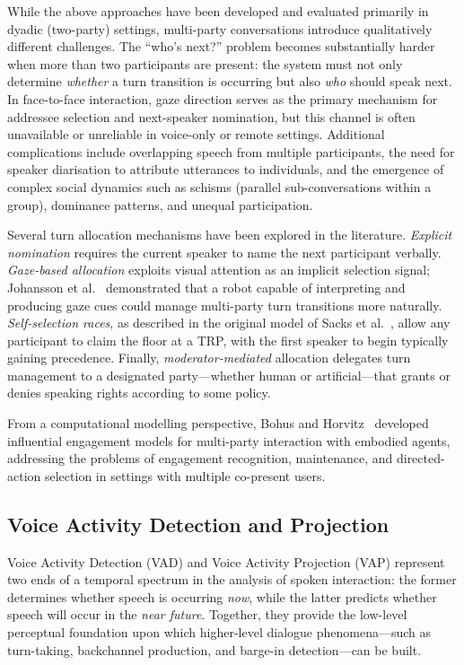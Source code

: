While the above approaches have been developed and evaluated primarily in dyadic (two-party) settings, multi-party conversations introduce qualitatively different challenges. The ``who's next?'' problem becomes substantially harder when more than two participants are present: the system must not only determine \emph{whether} a turn transition is occurring but also \emph{who} should speak next. In face-to-face interaction, gaze direction serves as the primary mechanism for addressee selection and next-speaker nomination, but this channel is often unavailable or unreliable in voice-only or remote settings. Additional complications include overlapping speech from multiple participants, the need for speaker diarisation to attribute utterances to individuals, and the emergence of complex social dynamics such as schisms (parallel sub-conversations within a group), dominance patterns, and unequal participation.

Several turn allocation mechanisms have been explored in the literature. \emph{Explicit nomination} requires the current speaker to name the next participant verbally. \emph{Gaze-based allocation} exploits visual attention as an implicit selection signal; Johansson et al.~\cite{johansson2013gaze} demonstrated that a robot capable of interpreting and producing gaze cues could manage multi-party turn transitions more naturally. \emph{Self-selection races}, as described in the original model of Sacks et al.~\cite{sacks1974turntaking}, allow any participant to claim the floor at a TRP, with the first speaker to begin typically gaining precedence. Finally, \emph{moderator-mediated} allocation delegates turn management to a designated party---whether human or artificial---that grants or denies speaking rights according to some policy.

From a computational modelling perspective, Bohus and Horvitz~\cite{bohus2009engagement,bohus2011multiparty} developed influential engagement models for multi-party interaction with embodied agents, addressing the problems of engagement recognition, maintenance, and directed-action selection in settings with multiple co-present users.

\subsection{Voice Activity Detection and Projection}
\label{sec:vad-vap}

Voice Activity Detection (VAD) and Voice Activity Projection (VAP) represent two ends of a temporal spectrum in the analysis of spoken interaction: the former determines whether speech is occurring \emph{now}, while the latter predicts whether speech will occur in the \emph{near future}. Together, they provide the low-level perceptual foundation upon which higher-level dialogue phenomena---such as turn-taking, backchannel production, and barge-in detection---can be built.

